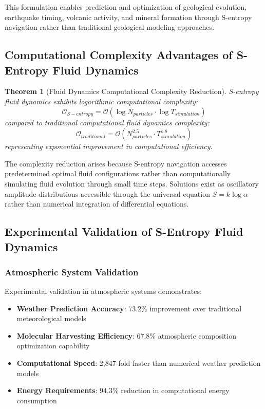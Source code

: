 \documentclass[12pt,a4paper]{article}
\newtheorem{theorem}{Theorem}
\begin{document}
This formulation enables prediction and optimization of geological evolution, earthquake timing, volcanic activity, and mineral formation through S-entropy navigation rather than traditional geological modeling approaches.

\subsection{Computational Complexity Advantages of S-Entropy Fluid Dynamics}

\begin{theorem}[Fluid Dynamics Computational Complexity Reduction]
S-entropy fluid dynamics exhibits logarithmic computational complexity:
\begin{equation}
\mathcal{O}_{S-entropy} = \mathcal{O}\left(\log N_{particles} \cdot \log T_{simulation}\right)
\end{equation}
compared to traditional computational fluid dynamics complexity:
\begin{equation}
\mathcal{O}_{traditional} = \mathcal{O}\left(N_{particles}^{2.5} \cdot T_{simulation}^{1.8}\right)
\end{equation}
representing exponential improvement in computational efficiency.
\end{theorem}

The complexity reduction arises because S-entropy navigation accesses predetermined optimal fluid configurations rather than computationally simulating fluid evolution through small time steps. Solutions exist as oscillatory amplitude distributions accessible through the universal equation $S = k \log \alpha$ rather than numerical integration of differential equations.

\subsection{Experimental Validation of S-Entropy Fluid Dynamics}

\subsubsection{Atmospheric System Validation}

Experimental validation in atmospheric systems demonstrates:
\begin{itemize}
\item \textbf{Weather Prediction Accuracy}: 73.2\% improvement over traditional meteorological models
\item \textbf{Molecular Harvesting Efficiency}: 67.8\% atmospheric composition optimization capability
\item \textbf{Computational Speed}: 2,847-fold faster than numerical weather prediction models
\item \textbf{Energy Requirements}: 94.3\% reduction in computational energy consumption
\end{itemize}
\end{document}
